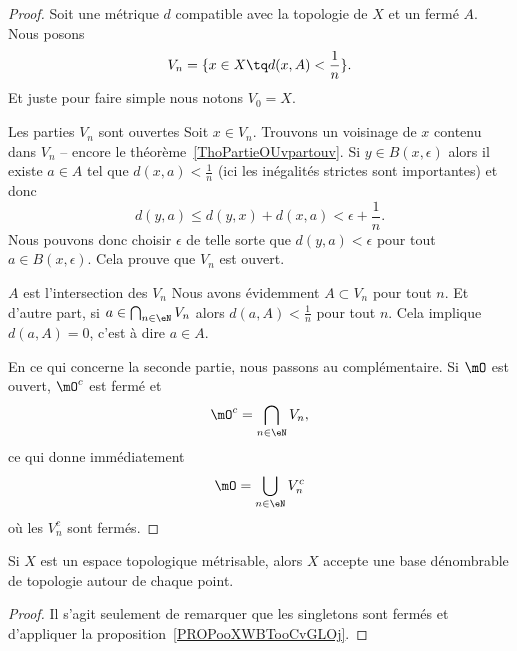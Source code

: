 \begin{proof}
    Soit une métrique \( d\) compatible avec la topologie de \( X\) et un fermé \( A\). Nous posons
    \begin{equation}
        V_n=\{ x\in X\tq d(x,A)<\frac{1}{ n } \}.
    \end{equation}
    Et juste pour faire simple nous notons \( V_0=X\).
    \begin{subproof}
        \item[Les parties \( V_n\) sont ouvertes]
            Soit \( x\in V_n\). Trouvons un voisinage de \( x\) contenu dans \( V_n\) -- encore le théorème~\ref{ThoPartieOUvpartouv}. Si \( y\in B(x,\epsilon)\) alors il existe \( a\in A\) tel que \( d(x,a)<\frac{1}{ n }\) (ici les inégalités strictes sont importantes) et donc
            \begin{equation}
                d(y,a)\leq d(y,x)+d(x,a)<\epsilon+\frac{1}{ n }.
            \end{equation}
            Nous pouvons donc choisir \( \epsilon\) de telle sorte que \( d(y,a)<\epsilon\) pour tout \( a\in B(x,\epsilon)\). Cela prouve que \( V_n\) est ouvert.
        \item[\( A\) est l'intersection des \( V_n\)]
            Nous avons évidemment \( A\subset V_n\) pour tout \( n\). Et d'autre part, si \( a\in\bigcap_{n\in \eN} V_n\) alors \( d(a,A)<\frac{1}{ n }\) pour tout \( n\). Cela implique \( d(a,A)=0\), c'est à dire \( a\in A\).
        \end{subproof}
    En ce qui concerne la seconde partie, nous passons au complémentaire. Si \( \mO\) est ouvert, \( \mO^c\) est fermé et
    \begin{equation}
        \mO^c=\bigcap_{n\in \eN}V_n,
    \end{equation}
    ce qui donne immédiatement
    \begin{equation}
        \mO=\bigcup_{n\in \eN}V_n^c
    \end{equation}
    où les \( V_n^c\) sont fermés.
\end{proof}

\begin{corollary}       \label{CORooTWFYooCNMieM}
    Si \( X\) est un espace topologique métrisable, alors \( X\) accepte une base dénombrable de topologie autour de chaque point.
\end{corollary}

\begin{proof}
    Il s'agit seulement de remarquer que les singletons sont fermés et d'appliquer la proposition~\ref{PROPooXWBTooCvGLOj}.
\end{proof}

